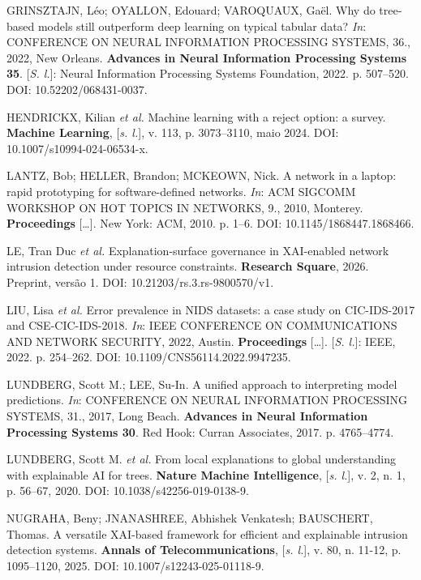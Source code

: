 \documentclass[
  article,
  12pt,
  oneside,
  a4paper,
  english,
  brazil
]{abntex2}
\begin{document}
GRINSZTAJN, Léo; OYALLON, Edouard; VAROQUAUX, Gaël. Why do tree-based models still outperform deep
learning on typical tabular data? \emph{In}: CONFERENCE ON NEURAL INFORMATION PROCESSING SYSTEMS,
36., 2022, New Orleans. \textbf{Advances in Neural Information Processing Systems 35}.
[\emph{S. l.}]: Neural Information Processing Systems Foundation, 2022. p. 507--520. DOI:
10.52202/068431-0037.\par

HENDRICKX, Kilian \emph{et al.} Machine learning with a reject option: a survey. \textbf{Machine
Learning}, [\emph{s. l.}], v. 113, p. 3073--3110, maio 2024. DOI: 10.1007/s10994-024-06534-x.\par

LANTZ, Bob; HELLER, Brandon; MCKEOWN, Nick. A network in a laptop: rapid prototyping for
software-defined networks. \emph{In}: ACM SIGCOMM WORKSHOP ON HOT TOPICS IN NETWORKS, 9., 2010,
Monterey. \textbf{Proceedings} [\ldots]. New York: ACM, 2010. p. 1--6. DOI:
10.1145/1868447.1868466.\par

LE, Tran Duc \emph{et al.} Explanation-surface governance in
XAI-enabled network intrusion detection under resource constraints. \textbf{Research Square},
2026. Preprint, versão 1. DOI: 10.21203/rs.3.rs-9800570/v1.\par

LIU, Lisa \emph{et al.} Error prevalence in NIDS
datasets: a case study on CIC-IDS-2017 and CSE-CIC-IDS-2018. \emph{In}: IEEE CONFERENCE ON
COMMUNICATIONS AND NETWORK SECURITY, 2022, Austin. \textbf{Proceedings} [\ldots]. [\emph{S. l.}]:
IEEE, 2022. p. 254--262. DOI: 10.1109/CNS56114.2022.9947235.\par

LUNDBERG, Scott M.; LEE, Su-In. A unified approach to interpreting model predictions. \emph{In}:
CONFERENCE ON NEURAL INFORMATION PROCESSING SYSTEMS, 31., 2017, Long Beach. \textbf{Advances in
Neural Information Processing Systems 30}. Red Hook: Curran Associates, 2017. p. 4765--4774.\par

LUNDBERG, Scott M. \emph{et al.} From local explanations to global understanding with explainable
AI for trees. \textbf{Nature Machine Intelligence}, [\emph{s. l.}], v. 2, n. 1, p. 56--67, 2020.
DOI: 10.1038/s42256-019-0138-9.\par

NUGRAHA, Beny; JNANASHREE, Abhishek Venkatesh; BAUSCHERT, Thomas. A versatile XAI-based framework
for efficient and explainable intrusion detection systems. \textbf{Annals of Telecommunications},
[\emph{s. l.}], v. 80, n. 11-12, p. 1095--1120, 2025. DOI: 10.1007/s12243-025-01118-9.\par
\end{document}
